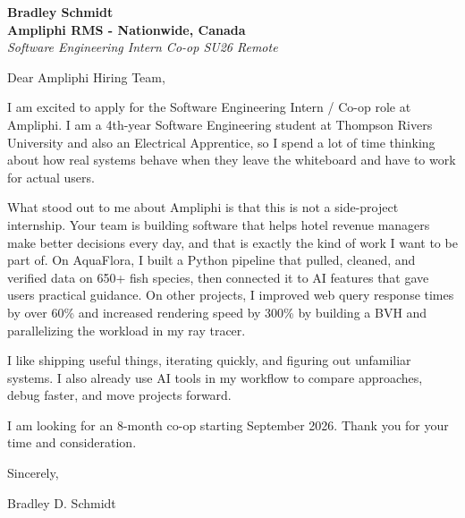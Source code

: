 \documentclass[11pt]{article}
\begin{document}
\textbf{Bradley Schmidt}\\
\vspace{0.5em}
\textbf{Ampliphi RMS - Nationwide, Canada}\\
\textit{Software Engineering Intern Co-op SU26 Remote}

Dear Ampliphi Hiring Team,

\par

I am excited to apply for the Software Engineering Intern / Co-op role at Ampliphi. I am a 4th-year Software Engineering student at Thompson Rivers University and also an Electrical Apprentice, so I spend a lot of time thinking about how real systems behave when they leave the whiteboard and have to work for actual users.

\par

What stood out to me about Ampliphi is that this is not a side-project internship. Your team is building software that helps hotel revenue managers make better decisions every day, and that is exactly the kind of work I want to be part of. On AquaFlora, I built a Python pipeline that pulled, cleaned, and verified data on 650+ fish species, then connected it to AI features that gave users practical guidance. On other projects, I improved web query response times by over 60\% and increased rendering speed by 300\% by building a BVH and parallelizing the workload in my ray tracer.

\par

I like shipping useful things, iterating quickly, and figuring out unfamiliar systems. I also already use AI tools in my workflow to compare approaches, debug faster, and move projects forward.

\par

I am looking for an 8-month co-op starting September 2026. Thank you for your time and consideration.

\par

Sincerely,

\par

Bradley D. Schmidt
\end{document}
